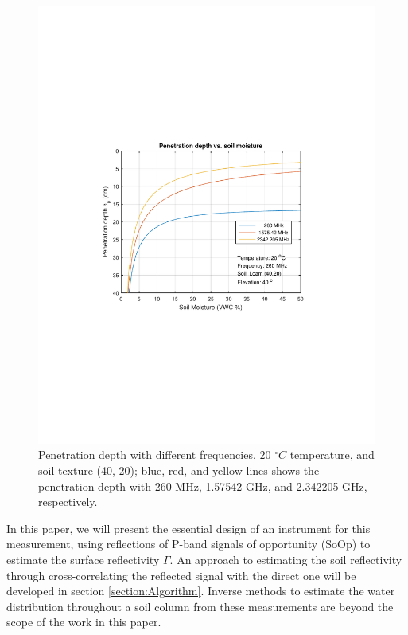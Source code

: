 \documentclass[draftcls,onecolumn]{IEEEtran}  %
\begin{document}
\begin{figure}[!t]
	\centering
	\includegraphics[width=6.5in]{pdf/penetration_depth.pdf}
	\caption{Penetration depth with different frequencies, 20 $^\circ C$ temperature, and soil texture (40, 20); blue, red, and yellow lines shows the penetration depth with 260 MHz, 1.57542 GHz, and 2.342205 GHz, respectively.}
   \centering
	\label{fig:depth}
\end{figure}


In this paper, we will present the essential design of an instrument for this measurement, using reflections of P-band signals of opportunity (SoOp) to estimate the surface reflectivity $\Gamma$. 
An approach to estimating the soil reflectivity through cross-correlating the reflected signal with the direct one will be developed in section \ref{section:Algorithm}.  Inverse methods to estimate the water distribution throughout a soil column from these measurements are beyond the scope of the work in this paper.  
\end{document}
